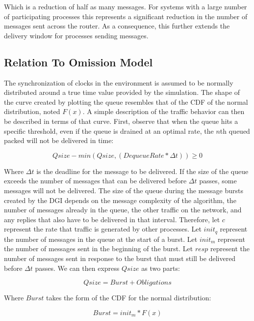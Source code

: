 Which is a reduction of half as many messages.
For systems with a large number of participating processes this represents a significant reduction in the number of messages sent across the router.
As a consequence, this further extends the delivery window for processes sending messages.

\subsection{Relation To Omission Model}

The synchronization of clocks in the environment is assumed to be normally distributed around a true time value provided by the simulation.
The shape of the curve created by plotting the queue resembles that of the \ac{CDF} of the normal distribution, noted $F(x)$.
A simple description of the traffic behavior can then be described in terms of that curve.
First, observe that when the queue hits a specific threshold, even if the queue is drained at an optimal rate, the $n$th queued packed will not be delivered in time:

\begin{equation}
Qsize - min(Qsize, (DequeueRate * \Delta t)) \geq 0
\label{eq:origin}
\end{equation}

Where $\Delta t$ is the deadline for the message to be delivered.
If the size of the queue exceeds the number of messages that can be delivered before $\Delta t$ passes, some messages will not be delivered.
The size of the queue during the message bursts created by the DGI depends on the message complexity of the algorithm, the number of messages already in the queue, the other traffic on the network, and any replies that also have to be delivered in that interval.
Therefore, let $c$ represent the rate that traffic is generated by other processes.
Let $init_q$ represent the number of messages in the queue at the start of a burst. 
Let $init_m$ represent the number of messages sent in the beginning of the burst.
Let $resp$ represent the number of messages sent in response to the burst that must still be delivered before $\Delta t$ passes.
We can then express $Qsize$ as two parts:

\begin{equation}
Qsize = Burst + Obligations
\end{equation}

Where $Burst$ takes the form of the \ac{CDF} for the normal distribution:

\begin{equation}
Burst = init_m * F(x)  
\end{equation}


